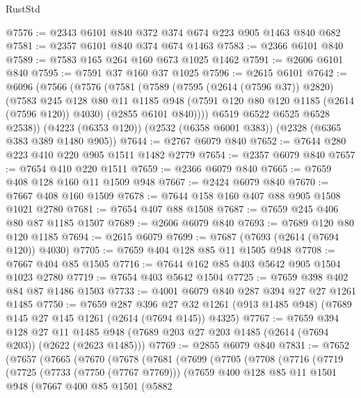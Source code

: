 \begin{lexlean}{RustStd}
\begin{coremodule}
@7576 := @2343 @6101 @840 @372 @374 @674 @223 @905 @1463 @840 @682
@7581 := @2357 @6101 @840 @374 @674 @1463
@7583 := @2366 @6101 @840
@7589 := @7583 @165 @264 @160 @673 @1025 @1462
@7591 := @2606 @6101 @840
@7595 := @7591 @37 @160 @37 @1025
@7596 := @2615 @6101
@7642 := @6096
    (@7566
      (@7576
        (@7581
          (@7589
            (@7595 (@2614 (@7596 @37)) @2820)
            (@7583
              @245
              @128
              @80
              @11
              @1185
              @948
              (@7591 @120 @80 @120 @1185 (@2614 (@7596 @120)) @4030)
              (@2855 @6101 @840))))
        @6519
        @6522
        @6525
        @6528
        @2538))
    (@4223 (@6353 @120))
    (@2532 (@6358 @6001 @383))
    (@2328 (@6365 @383 @389 @1480 @905))
@7644 := @2767 @6079 @840
@7652 := @7644 @280 @223 @410 @220 @905 @1511 @1482 @2779
@7654 := @2357 @6079 @840
@7657 := @7654 @410 @220 @1511
@7659 := @2366 @6079 @840
@7665 := @7659 @408 @128 @160 @11 @1509 @948
@7667 := @2424 @6079 @840
@7670 := @7667 @408 @160 @1509
@7678 := @7644 @158 @160 @407 @88 @905 @1508 @1021 @2780
@7681 := @7654 @407 @88 @1508
@7687 := @7659 @245 @406 @80 @87 @1185 @1507
@7689 := @2606 @6079 @840
@7693 := @7689 @120 @80 @120 @1185
@7694 := @2615 @6079
@7699 := @7687 (@7693 (@2614 (@7694 @120)) @4030)
@7705 := @7659 @404 @128 @85 @11 @1505 @948
@7708 := @7667 @404 @85 @1505
@7716 := @7644 @162 @85 @403 @5642 @905 @1504 @1023 @2780
@7719 := @7654 @403 @5642 @1504
@7725 := @7659 @398 @402 @84 @87 @1486 @1503
@7733 := @4001 @6079 @840 @287 @394 @27 @27 @1261 @1485
@7750 := @7659
    @287
    @396
    @27
    @32
    @1261
    (@913 @1485 @948)
    (@7689 @145 @27 @145 @1261 (@2614 (@7694 @145)) @4325)
@7767 := @7659
    @394
    @128
    @27
    @11
    @1485
    @948
    (@7689 @203 @27 @203 @1485 (@2614 (@7694 @203)) (@2622 (@2623 @1485)))
@7769 := @2855 @6079 @840
@7831 := @7652
    (@7657
      (@7665
        (@7670
          (@7678
            (@7681
              (@7699
                (@7705
                  (@7708
                    (@7716
                      (@7719
                        (@7725
                          (@7733 (@7750 (@7767 @7769)))
                          (@7659
                            @400
                            @128
                            @85
                            @11
                            @1501
                            @948
                            (@7667
                              @400
                              @85
                              @1501
                              (@5882

\end{coremodule}
\end{lexlean}
